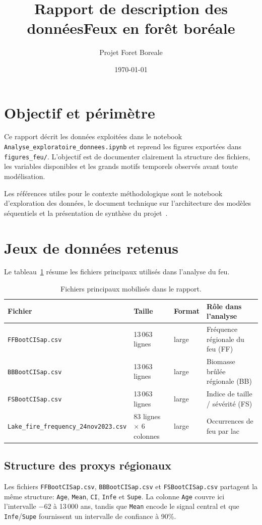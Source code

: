 \documentclass[11pt,a4paper]{article}
\title{Rapport de description des donn\'ees\newline Feux en for\^et bor\'eale}
\author{Projet Foret Boreale}
\date{\today}
\begin{document}
\maketitle

\section{Objectif et p\'erim\`etre}
Ce rapport d\'ecrit les donn\'ees exploit\'ees dans le notebook \texttt{Analyse\_exploratoire\_donnees.ipynb} et reprend les figures export\'ees dans \texttt{figures\_feu/}. L'objectif est de documenter clairement la structure des fichiers, les variables disponibles et les grands motifs temporels observ\'es avant toute mod\'elisation.

Les r\'ef\'erences utiles pour le contexte m\'ethodologique sont le notebook d'exploration des donn\'ees, le document technique sur l'architecture des mod\`eles s\'equentiels et la pr\'esentation de synth\`ese du projet~\cite{nb_explo,doc_modeles,pres_feu}.

\section{Jeux de donn\'ees retenus}
Le tableau~\ref{tab:sources} r\'esume les fichiers principaux utilis\'es dans l'analyse du feu.

\begin{table}[H]
\centering
\begin{tabular}{p{4.5cm} p{2.2cm} p{2.2cm} p{5.5cm}}
\toprule
\textbf{Fichier} & \textbf{Taille} & \textbf{Format} & \textbf{R\^ole dans l'analyse} \\
\midrule
\texttt{FFBootCISap.csv} & 13\,063 lignes & large & Fr\'equence r\'egionale du feu (FF) \\
\texttt{BBBootCISap.csv} & 13\,063 lignes & large & Biomasse br\^ul\'ee r\'egionale (BB) \\
\texttt{FSBootCISap.csv} & 13\,063 lignes & large & Indice de taille / s\'ev\'erit\'e (FS) \\
\texttt{Lake\_fire\_frequency\_24nov2023.csv} & 83 lignes $\times$ 6 colonnes & large & Occurrences de feu par lac \\
\bottomrule
\end{tabular}
\caption{Fichiers principaux mobilis\'es dans le rapport.}
\label{tab:sources}
\end{table}

\subsection*{Structure des proxys r\'egionaux}
Les fichiers \texttt{FFBootCISap.csv}, \texttt{BBBootCISap.csv} et \texttt{FSBootCISap.csv} partagent la m\^eme structure: 
\texttt{Age}, \texttt{Mean}, \texttt{CI}, \texttt{Infe} et \texttt{Supe}. La colonne \texttt{Age} couvre ici l'intervalle \(-62\) \`a 13\,000 ans, tandis que \texttt{Mean} encode le signal central et que \texttt{Infe}/\texttt{Supe} fournissent un intervalle de confiance \`a 90\%.
\end{document}
